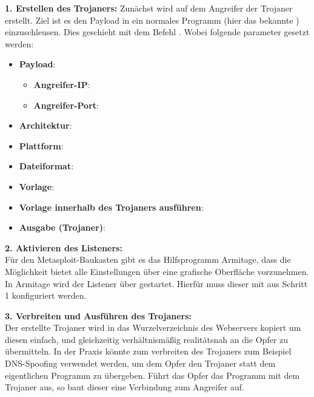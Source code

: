 \textbf{1. Erstellen des Trojaners: } 
Zunächst wird auf dem Angreifer der Trojaner erstellt.
Ziel ist es den Payload  in ein normales Programm (hier das bekannte ) einzuschleusen. 
Dies geschieht mit dem Befehl  \cite{OSMSFV}. Wobei folgende parameter gesetzt werden:
\begin{itemize}
	\item \textbf{Payload}: \\
	      \begin{itemize}
		      \item  \textbf{Angreifer-IP}: 
		      \item \textbf{Angreifer-Port}: 
		  \end{itemize}
	\item \textbf{Architektur}: 
	\item \textbf{Plattform}: 
	\item \textbf{Dateiformat}: 
	\item \textbf{Vorlage}: 
	\item \textbf{Vorlage innerhalb des Trojaners ausführen}: 
	\item \textbf{Ausgabe (Trojaner)}: 
\end{itemize}

\bigskip
\textbf{2. Aktivieren des Listeners: } \hfill \\
Für den Metasploit-Baukasten gibt es das Hilfsprogramm Armitage, dass die Möglichkeit bietet alle Einstellungen über eine grafische Oberfläche vorzunehmen.
In Armitage wird der Listener über  gestartet. Hierfür muss dieser mit  aus Schritt 1 konfiguriert werden.


\textbf{3. Verbreiten und Ausführen des Trojaners: } \hfill \\
Der erstellte Trojaner wird in das Wurzelverzeichnis des Webservers  kopiert um diesen einfach, und gleichzeitig verhältnismäßig realitätsnah an die Opfer zu übermitteln.
In der Praxis könnte zum verbreiten des Trojaners zum Beispiel DNS-Spoofing verwendet werden, um dem Opfer den Trojaner statt dem eigentlichen Programm zu übergeben.
Führt das Opfer das Programm mit dem Trojaner aus, so baut dieser eine Verbindung zum Angreifer auf. 


